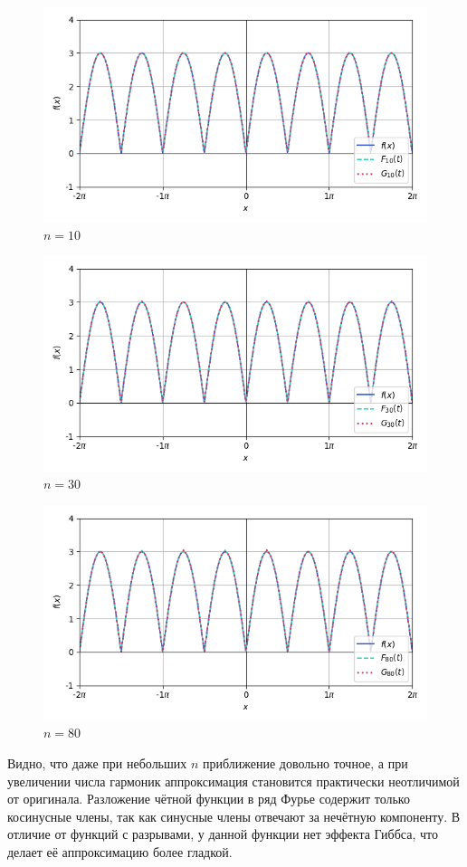 \documentclass[a4paper]{article}
\begin{document}
\begin{figure}[H]
    \centering
    \includegraphics[width=0.7\linewidth]{even/Im10.png}
    \caption{$n = 10$}
\end{figure}
\begin{figure}[H]
    \centering
    \includegraphics[width=0.7\linewidth]{even/Im30.png}
    \caption{$n = 30$}
\end{figure}
\begin{figure}[H]
    \centering
    \includegraphics[width=0.7\linewidth]{even/Im80.png}
    \caption{$n = 80$}
\end{figure}

Видно, что даже при небольших $n$ приближение довольно точное, а при увеличении числа гармоник аппроксимация становится практически неотличимой от оригинала. Разложение чётной функции в ряд Фурье содержит только косинусные члены, так как синусные члены отвечают за нечётную компоненту. В отличие от функций с разрывами, у данной функции нет эффекта Гиббса, что делает её аппроксимацию более гладкой.
\end{document}

